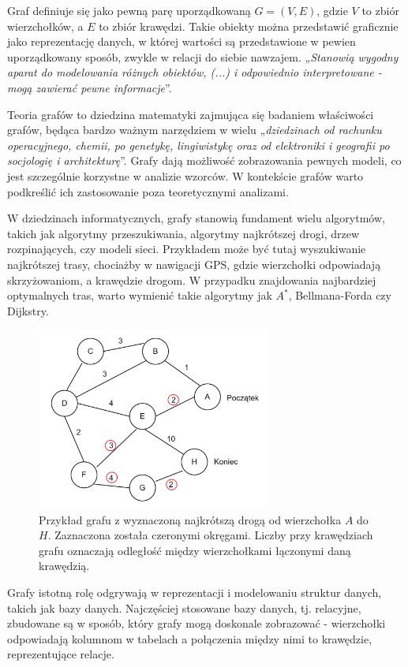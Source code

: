 Graf definiuje się jako pewną parę uporządkowaną $G = (V, E)$, gdzie $V$ to zbiór wierzchołków,
a $E$ to zbiór krawędzi.
Takie obiekty można przedstawić graficznie jako reprezentację danych,
w której wartości są przedstawione w pewien uporządkowany sposób, zwykle w relacji do siebie nawzajem.
„\textit{Stanowią wygodny aparat do modelowania różnych obiektów, (...) i odpowiednio interpretowane
- mogą zawierać pewne informacje}”\cite{Wloch2008}.

Teoria grafów to dziedzina matematyki zajmująca się badaniem właściwości grafów,
będąca bardzo ważnym narzędziem w wielu „\textit{dziedzinach od rachunku operacyjnego, chemii, po genetykę, lingiwistykę
oraz od elektroniki i geografii po socjologię i architekturę}”\cite{Wilson2012}.
Grafy dają możliwość zobrazowania pewnych modeli, co jest szczególnie korzystne w analizie wzorców.
W kontekście grafów warto podkreślić ich zastosowanie poza teoretycznymi analizami.

W dziedzinach informatycznych, grafy stanowią fundament wielu algorytmów, takich jak algorytmy przeszukiwania,
algorytmy najkrótszej drogi, drzew rozpinających, czy modeli sieci.
Przykładem może być tutaj wyszukiwanie najkrótszej trasy, chociażby w nawigacji GPS,
gdzie wierzchołki odpowiadają skrzyżowaniom, a krawędzie drogom.
W przypadku znajdowania najbardziej optymalnych tras, warto wymienić takie algorytmy jak $A^*$, Bellmana-Forda czy Dijkstry.

\begin{figure}[ht]
	\centering
	\includegraphics[height=6cm]{resources/introduction/images/shortest_path.png}
	\caption{Przykład grafu z wyznaczoną najkrótszą drogą od wierzchołka $A$ do $H$.
		Zaznaczona została czeronymi okręgami.
		Liczby przy krawędziach grafu oznaczają odległość między wierzchołkami łączonymi daną krawędzią.}
    \label{Fig:intro-1}
\end{figure}

Grafy istotną rolę odgrywają w reprezentacji i modelowaniu struktur danych, takich jak bazy danych.
Najczęściej stosowane bazy danych, tj. relacyjne, zbudowane są w sposób, który grafy mogą doskonale zobrazować -
wierzchołki odpowiadają kolumnom w tabelach a połączenia między nimi to krawędzie, reprezentujące relacje.

